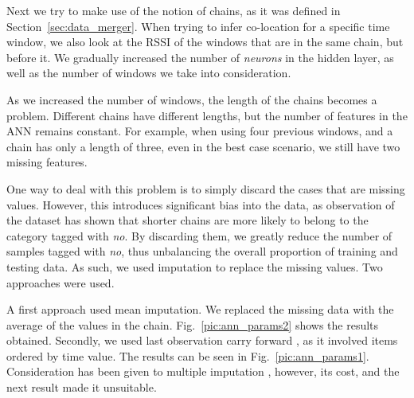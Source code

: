 Next we try to make use of the notion of chains, as it was defined in Section~\ref{sec:data_merger}. When trying to infer co-location for a specific time window, we also look at the RSSI of the windows that are in the same chain, but before it. We gradually increased the number of \textit{neurons} in the hidden layer, as well as the number of windows we take into consideration. 

As we increased the number of windows, the length of the chains becomes a problem. Different chains have different lengths, but the number of features in the ANN remains constant. For example, when using four previous windows, and a chain has only a length of three, even in the best case scenario, we still have two missing features. 

One way to deal with this problem is to simply discard the cases that are missing values. However, this introduces significant bias into the data, as observation of the dataset has shown that shorter chains are more likely to belong to the category tagged with \textit{no}. By discarding them, we greatly reduce the number of samples tagged with \textit{no}, thus unbalancing the overall proportion of training and testing data. As such, we used imputation to replace the missing values. Two approaches were used.

A first approach used mean imputation. We replaced the missing data with the average of the values in the chain. Fig.~\ref{pic:ann_params2} shows the results obtained. Secondly, we used last observation carry forward \cite{locf}, as it involved items ordered by time value. The results can be seen in Fig.~\ref{pic:ann_params1}. Consideration has been given to multiple imputation \cite{rubin2009multiple}, however, its cost, and the next result made it unsuitable.  

